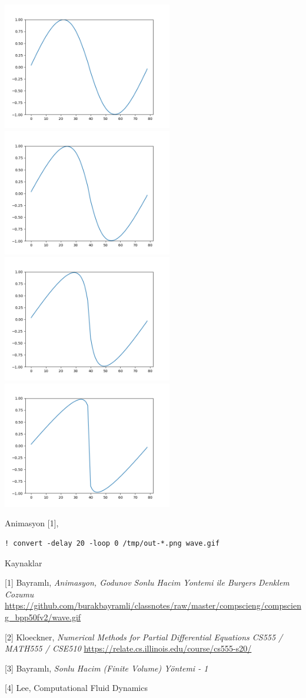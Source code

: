 \documentclass[12pt,fleqn]{article}\usepackage{../../common}
\begin{document}
\includegraphics[width=20em]{out-005.png}
\includegraphics[width=20em]{out-010.png}
\includegraphics[width=20em]{out-020.png}
\includegraphics[width=20em]{out-030.png}

Animasyon [1],

\begin{verbatim}
! convert -delay 20 -loop 0 /tmp/out-*.png wave.gif
\end{verbatim}
  
Kaynaklar

[1] Bayramlı, {\em Animasyon, Godunov Sonlu Hacim Yontemi ile Burgers Denklem Cozumu}
    \url{https://github.com/burakbayramli/classnotes/raw/master/compscieng/compscieng_bpp50fv2/wave.gif}

[2] Kloeckner, {\em Numerical Methods for Partial Differential Equations CS555 / MATH555 / CSE510}
    \url{https://relate.cs.illinois.edu/course/cs555-s20/}

[3] Bayramlı, {\em Sonlu Hacim (Finite Volume) Yöntemi - 1}

[4] Lee, Computational Fluid Dynamics
\end{document}
